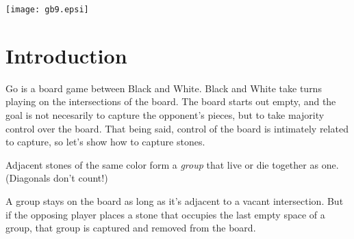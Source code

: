 \documentclass{article}
\begin{document}
\hbox{}
\vfill

\begin{center}
\texttt{[image: gb9.epsi]}
\end{center}

\vfill

\newpage

\section*{Introduction}
Go is a board game between Black and White.  Black and White take
turns playing on the intersections of the board.  The board starts out
empty, and the goal is not necesarily to capture the opponent's
pieces, but to take majority control over the board.  That being said,
control of the board is intimately related to capture, so let's show
how to capture stones.

Adjacent stones of the same color form a \emph{group} that live or die
together as one.  (Diagonals don't count!)

\begin{center}
\cleargoban
{}
\hspace{.5in}%
\hspace{.5in}%
\end{center}
%
A group stays on the board as long as it's adjacent to a vacant
intersection.  But if the opposing player places a stone that occupies
the last empty space of a group, that group is captured and removed
from the board.


\begin{center}
\end{center}
\end{document}
